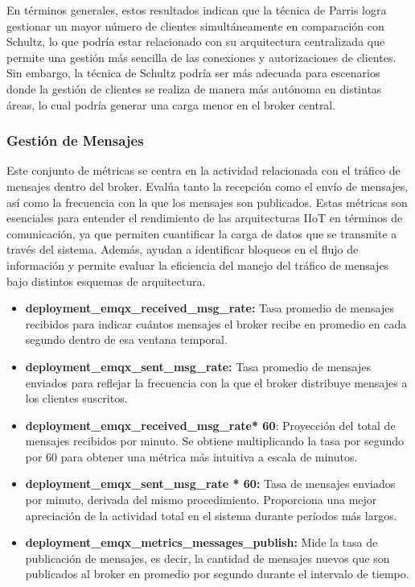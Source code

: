 

En términos generales, estos resultados indican que la técnica de Parris logra gestionar un mayor número de clientes simultáneamente en comparación con Schultz, lo que podría estar relacionado con su arquitectura centralizada que permite una gestión más sencilla de las conexiones y autorizaciones de clientes. Sin embargo, la técnica de Schultz podría ser más adecuada para escenarios donde la gestión de clientes se realiza de manera más autónoma en distintas áreas, lo cual podría generar una carga menor en el broker central.





\subsubsection{Gestión de Mensajes}

Este conjunto de métricas se centra en la actividad relacionada con el tráfico de mensajes dentro del broker. Evalúa tanto la recepción como el envío de mensajes, así como la frecuencia con la que los mensajes son publicados. Estas métricas son esenciales para entender el rendimiento de las arquitecturas IIoT en términos de comunicación, ya que permiten cuantificar la carga de datos que se transmite a través del sistema. Además, ayudan a identificar bloqueos en el flujo de información y permite evaluar la eficiencia del manejo del tráfico de mensajes bajo distintos esquemas de arquitectura.


\begin{itemize}
    \item \textbf{deployment\_emqx\_received\_msg\_rate:} Tasa promedio de mensajes recibidos para indicar cuántos mensajes el broker recibe en promedio en cada segundo dentro de esa ventana temporal.

    \item \textbf{deployment\_emqx\_sent\_msg\_rate:} Tasa promedio de mensajes enviados para reflejar la frecuencia con la que el broker distribuye mensajes a los clientes suscritos.

    \item \textbf{deployment\_emqx\_received\_msg\_rate* 60}: Proyección del total de mensajes recibidos por minuto. Se obtiene multiplicando la tasa por segundo por 60 para obtener una métrica más intuitiva a escala de minutos.

    \item \textbf{deployment\_emqx\_sent\_msg\_rate * 60:} Tasa de mensajes enviados por minuto, derivada del mismo procedimiento. Proporciona una mejor apreciación de la actividad total en el sistema durante períodos más largos.

    \item \textbf{deployment\_emqx\_metrics\_messages\_publish:} Mide la tasa de publicación de mensajes, es decir, la cantidad de mensajes nuevos que son publicados al broker en promedio por segundo durante el intervalo de tiempo.

\end{itemize}

